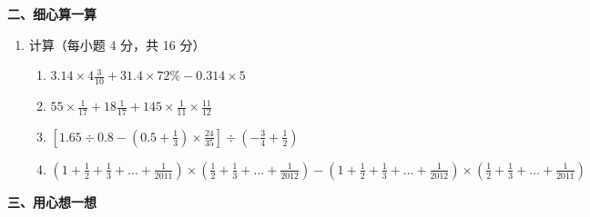 \documentclass[11pt,a4paper]{ctexart}
\begin{document}
\vspace{0.8cm}

\noindent \textbf{二、细心算一算}

\begin{enumerate}
    \item[11.] 计算（每小题 4 分，共 16 分）
    \begin{enumerate}
        \item[(1)] $3.14 \times 4\frac{3}{10} + 31.4 \times 72\% - 0.314 \times 5$
        \vspace{3.5cm}
        
        \item[(2)] $55 \times \frac{1}{17} + 18\frac{1}{17} + 145 \times \frac{1}{11} \times \frac{11}{12}$
        \vspace{3.5cm}
        
        \item[(3)] $\left[ 1.65 \div 0.8 - \left(0.5 + \frac{1}{3}\right) \times \frac{24}{35} \right] \div \left(-\frac{3}{4} + \frac{1}{2}\right)$
        \vspace{3.5cm}
        
        \item[(4)] $\left( 1 + \frac{1}{2} + \frac{1}{3} + \dots + \frac{1}{2011} \right) \times \left( \frac{1}{2} + \frac{1}{3} + \dots + \frac{1}{2012} \right) - \left( 1 + \frac{1}{2} + \frac{1}{3} + \dots + \frac{1}{2012} \right) \times \left( \frac{1}{2} + \frac{1}{3} + \dots + \frac{1}{2011} \right)$
        \vspace{3.5cm}
    \end{enumerate}
\end{enumerate}

\vspace{0.8cm}

\noindent \textbf{三、用心想一想}
\end{document}
